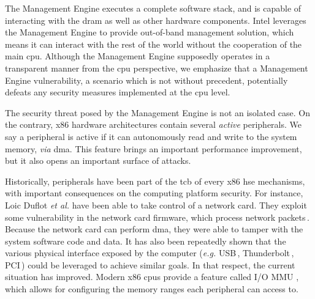 %
The Management Engine executes a complete software stack, and is capable of
interacting with the \ac{dram} as well as other hardware components.
%
Intel leverages the Management Engine to provide out-of-band management
solution, which means it can interact with the rest of the world without the
cooperation of the main \ac{cpu}.
%
Although the Management Engine supposedly operates in a transparent manner from
the \ac{cpu} perspective, we emphasize that a Management Engine vulnerability, a
scenario which is not without precedent, potentially defeats any security
measures implemented at the \ac{cpu} level.
%

The security threat posed by the Management Engine is not an isolated case.
%
On the contrary, x86 hardware architectures contain several \emph{active}
peripherals.
%
We say a peripheral is active if it can autonomously read and write to the
system memory, \emph{via} \ac{dma}.
%
This feature brings an important performance improvement, but it also opens an
important surface of attacks.

Historically, peripherals have been part of the \ac{tcb} of every x86 \ac{hse}
mechanisms, with important consequences on the computing platform security.
%
%
For instance, Loic Duflot \emph{et al.} have been able to take control of a
network card. They exploit some vulnerability in the network card firmware,
which process network packets\,\cite{duflot2010network}.
%
Because the network card can perform \ac{dma}, they were able to tamper with the
system software code and data.
%
It has also been repeatedly shown that the various physical interface exposed by
the computer (\emph{e.g.} USB\,\cite{nohl2014badusb},
Thunderbolt\,\cite{hudson2015thunderstrike}, PCI\,\cite{chifflier2013uefi})
could be leveraged to achieve similar goals.
%
In that respect, the current situation has improved.
%
Modern x86 \acp{cpu} provide a feature called I/O MMU , which allows
for configuring the memory ranges each peripheral can access to.

